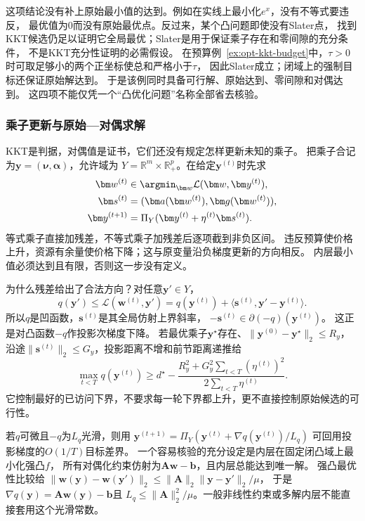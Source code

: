 这项结论没有补上原始最小值的达到。例如在实线上最小化$e^x$，没有不等式要违反，
最优值为$0$而没有原始最优点。反过来，某个凸问题即使没有Slater点，
找到KKT候选仍足以证明它全局最优；Slater是用于保证乘子存在和零间隙的充分条件，
不是KKT充分性证明的必需假设。
在预算例~\ref{ex:opt-kkt-budget}中，$\tau>0$时可取足够小的两个正坐标使总和严格小于$\tau$，
因此Slater成立；闭域上的强制目标还保证原始解达到。
于是该例同时具备可行解、原始达到、零间隙和对偶达到。
这四项不能仅凭一个“凸优化问题”名称全部省去核验。

\subsubsection{乘子更新与原始—对偶求解}
\label{sec:opt-multiplier-updates}

KKT是判据，对偶值是证书，它们还没有规定怎样更新未知的乘子。
把乘子合记为$\bm y=(\bm\nu,\bm\alpha)$，允许域为
$Y=\mathbb R^m\times\mathbb R_+^p$。在给定$\bm y^{(t)}$时先求
\[
 \begin{aligned}
 \bm w^{(t)}&\in\argmin_{\bm w}\mathcal L(\bm w,\bm y^{(t)}),\\
 \bm s^{(t)}&=(\bm a(\bm w^{(t)}),\bm g(\bm w^{(t)})),\\
 \bm y^{(t+1)}&=\Pi_Y(\bm y^{(t)}+\eta^{(t)}\bm s^{(t)}).
 \end{aligned}
\]
等式乘子直接加残差，不等式乘子加残差后逐项截到非负区间。
违反预算使价格上升，资源有余量使价格下降；这与原变量沿负梯度更新的方向相反。
内层最小值必须达到且有限，否则这一步没有定义。

为什么残差给出了合法方向？对任意$\bm y'\in Y$，
\[
 q(\bm y')\leq\mathcal L(\bm w^{(t)},\bm y')
 =q(\bm y^{(t)})+\langle\bm s^{(t)},\bm y'-\bm y^{(t)}\rangle.
\]
所以$q$是凹函数，$\bm s^{(t)}$是其全局仿射上界斜率，
$-\bm s^{(t)}\in\partial(-q)(\bm y^{(t)})$。
这正是对凸函数$-q$作投影次梯度下降。
若最优乘子$\bm y^\star$存在、$\|\bm y^{(0)}-\bm y^\star\|_2\leq R_y$，
沿途$\|\bm s^{(t)}\|_2\leq G_y$，投影距离不增和前节距离递推给
\[
 \max_{t<T}q(\bm y^{(t)})\geq
 d^\star-\frac{R_y^2+G_y^2\sum_{t<T}(\eta^{(t)})^2}{2\sum_{t<T}\eta^{(t)}}.
\]
它控制最好的已访问下界，不要求每一轮下界都上升，更不直接控制原始候选的可行性。

若$q$可微且$-q$为$L_q$光滑，则用
$\bm y^{(t+1)}=\Pi_Y(\bm y^{(t)}+\nabla q(\bm y^{(t)})/L_q)$
可回用投影梯度的$O(1/T)$目标差界。
一个容易核验的充分设定是内层在固定闭凸域上最小化强凸$f$，
所有对偶化约束仿射为$\bm A\bm w-\bm b$，且内层总能达到唯一解。
强凸最优性比较给
$\|\bm w(\bm y)-\bm w(\bm y')\|_2
\leq\|\bm A\|_2\|\bm y-\bm y'\|_2/\mu$，
于是$\nabla q(\bm y)=\bm A\bm w(\bm y)-\bm b$且
$L_q\leq\|\bm A\|_2^2/\mu$。一般非线性约束或多解内层不能直接套用这个光滑常数。

